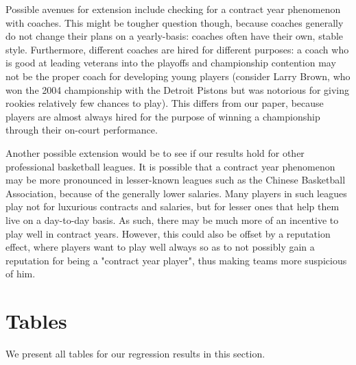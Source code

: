 \documentclass[12pt]{article}
\begin{document}
	Possible avenues for extension include checking for a contract year phenomenon with coaches. This might be tougher question though, because coaches generally do not change their plans on a yearly-basis: coaches often have their own, stable style. Furthermore, different coaches are hired for different purposes: a coach who is good at leading veterans into the playoffs and championship contention may not be the proper coach for developing young players (consider Larry Brown, who won the 2004 championship with the Detroit Pistons but was notorious for giving rookies relatively few chances to play). This differs from our paper, because players are almost always hired for the purpose of winning a championship through their on-court performance.
	
	Another possible extension would be to see if our results hold for other professional basketball leagues. It is possible that a contract year phenomenon may be more pronounced in lesser-known leagues such as the Chinese Basketball Association, because of the generally lower salaries. Many players in such leagues play not for luxurious contracts and salaries, but for lesser ones that help them live on a day-to-day basis. As such, there may be much more of an incentive to play well in contract years. However, this could also be offset by a reputation effect, where players want to play well always so as to not possibly gain a reputation for being a "contract year player", thus making teams more suspicious of him.
	
	
	\clearpage
	
	
	\clearpage
	
	\singlespacing
	
	
	
	
	
	\clearpage
	
	\onehalfspacing
	
	\appendix
	
	\section{Tables} \label{sec:tab}
	
	We present all tables for our regression results in this section.
	
\end{document}
